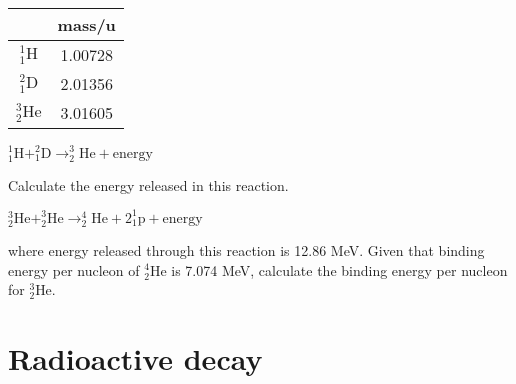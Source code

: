 \begin{marginfigure}
	\vspace*{-21pt}
	\flushright
	\begin{tabular}{|c|c|}
		\hline
		& mass/u \\ \hline
		\rule[-1em]{0pt}{3em}$^1_1\text{H}$ & 1.00728 \\ \hline
		\rule[-1em]{0pt}{3em}$^2_1\text{D}$ & 2.01356 \\ \hline 
		\rule[-1em]{0pt}{3em}$^3_2\text{He}$ & 3.01605 \\ \hline
	\end{tabular}
	\vspace*{-10pt}
\end{marginfigure}




{

\centering

$ ^1_1\text{H} + ^2_1\text{D} \longrightarrow ^3_2\text{He} + \text{energy}$

}
	
\noindent Calculate the energy released in this reaction.



\newpage




{
	
	\centering

	$^3_2\text{He} + ^3_2\text{He} \longrightarrow ^4_2\text{He} + 2 ^1_1\text{p} +\text{energy}$	
	
}

\noindent where energy released through this reaction is 12.86 MeV. Given that binding energy per nucleon of $^4_2\text{He}$ is 7.074 MeV, calculate the binding energy per nucleon for $^3_2\text{He}$.





\section{Radioactive decay}


